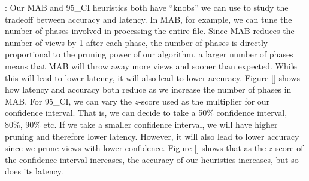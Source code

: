 :
Our MAB and 95\_CI heuristics both have ``knobs'' we can use to study the
tradeoff between accuracy and latency.
In MAB, for example, we can tune the number of phases involved in
processing the entire file. 
Since MAB reduces the number of views by 1 after each phase, the number of
phases is directly proportional to the pruning power of our algorithm.
 a larger
number of phases means that MAB will throw away more views and sooner than expected.
While this will lead to lower latency, it will also lead to lower accuracy.
Figure \ref{} shows how latency and accuracy both reduce as we increase the
number of phases in MAB.
For 95\_CI, we can vary the $z$-score used as the
multiplier for our confidence interval. That is, we can decide to take a 50\% confidence interval, 80\%, 90\%
etc.
If we take a smaller confidence interval, we will have higher pruning and
therefore lower latency.
However, it will also lead to lower accuracy since we prune views with
lower confidence.
Figure \ref{} shows that as the $z$-score of the confidence interval increases,
the accuracy of our heuristics increases, but so does its latency.




